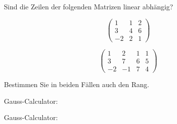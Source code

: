 Sind die Zeilen der folgenden Matrizen linear abhängig?
\begin{teilaufgaben}
\item
\[
\begin{pmatrix}
1&1&2\\
3&4&6\\
-2&2&1
\end{pmatrix}
\]
\item
\[
\begin{pmatrix}
1&2&1&1\\
3&7&6&5\\
-2&-1&7&4
\end{pmatrix}
\]
\end{teilaufgaben}
Bestimmen Sie in beiden Fällen auch den Rang.

\begin{hinweis}
\begin{teilaufgaben}
\item Gauss-Calculator: 
\item Gauss-Calculator: 
\end{teilaufgaben}
\end{hinweis}


